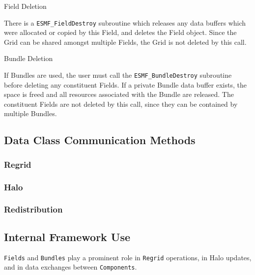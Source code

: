 \begin{description}

\item{Field Deletion}

There is a {\tt ESMF\_FieldDestroy} subroutine which releases
any data buffers which were allocated or copied by this Field,
and deletes the Field object.  Since the Grid can be shared
amongst multiple Fields, the Grid is not deleted by this call.

\item{Bundle Deletion}

If Bundles are used, the user must call the 
{\tt ESMF\_BundleDestroy} subroutine before deleting any constituent
Fields.  If a private Bundle data buffer exists, the space is
freed and all resources associated with the Bundle are released.
The constituent Fields are not deleted by this call, since they
can be contained by multiple Bundles.

\end{description}



\subsection{Data Class Communication Methods}

\subsubsection{Regrid}

\subsubsection{Halo}

\subsubsection{Redistribution}


\subsection{Internal Framework Use}

{\tt Fields} and {\tt Bundles} play a prominent role in {\tt Regrid} 
operations, in Halo updates,  
and in data exchanges between {\tt Components}.

